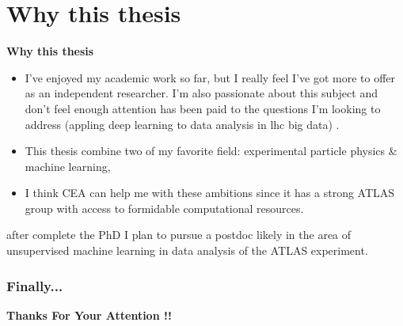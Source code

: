 \documentclass[11pt,aspectratio=169]{beamer}
\begin{document}
% 
% 
% 
% 
% 
% 



\section{Why this thesis}

\begin{frame}{\underline{\secname}}
	

	\begin{center}
		\textbf{Why this thesis}
	\end{center}
				\begin{itemize}			  \setlength\itemsep{0em}
\item
I’ve enjoyed my academic work so far, but I really feel I’ve got more to offer as an independent researcher. I’m also passionate about this subject and don’t feel enough attention has been paid to the questions I’m looking to address (appling deep learning to data analysis in lhc big data) .
\item

	
	This thesis combine two of my favorite field: experimental particle physics \& machine learning,
\item
	
I think CEA can help me with these ambitions since it has a strong ATLAS group with access to formidable computational resources.	
\end{itemize}

	\begin{center}
		\textbf{}
	\end{center}
	after complete the PhD I plan to pursue a postdoc likely in the area of unsupervised machine learning in data analysis of the ATLAS experiment.
	
\end{frame}





{
\begin{frame}\frametitle{{\color{white}Finally...}}


\centering

{\vspace{17em} \Huge {\color{white}	\textbf{Thanks For Your Attention !!}\\}}
\end{frame}

}


\end{document}

